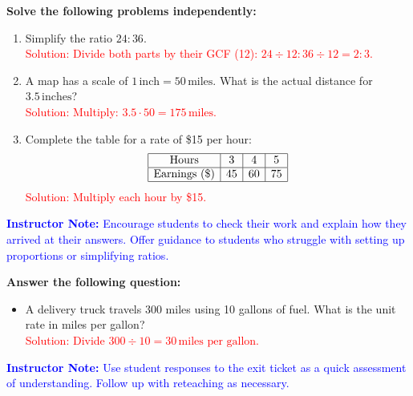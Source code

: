 \documentclass[12pt]{article}
\begin{document}
\begin{tcolorbox}[colframe=black!60, colback=white, 
coltitle=black, colbacktitle=black!15, fonttitle=\bfseries\Large, 
title=Independent Practice, halign title=center, left=10pt, right=10pt, top=10pt, bottom=15pt]
\textbf{Solve the following problems independently:}
\begin{enumerate}[itemsep=3em]
    \item Simplify the ratio \( 24:36 \).\\
    \textcolor{red}{Solution: Divide both parts by their GCF (12): \( 24 \div 12 : 36 \div 12 = 2:3 \).}

    \item A map has a scale of \( 1 \, \text{inch} = 50 \, \text{miles} \). What is the actual distance for \( 3.5 \, \text{inches} \)?\\
    \textcolor{red}{Solution: Multiply: \( 3.5 \cdot 50 = 175 \, \text{miles} \).}

    \item Complete the table for a rate of \$15 per hour:
    \[
    \begin{array}{|c|c|c|c|}
    \hline
    \text{Hours} & 3 & 4 & 5 \\
    \hline
    \text{Earnings (\$)} & 45 & 60 & 75 \\
    \hline
    \end{array}
    \]
    \textcolor{red}{Solution: Multiply each hour by \$15.}
\end{enumerate}

\textcolor{blue}{\textbf{Instructor Note:} Encourage students to check their work and explain how they arrived at their answers. Offer guidance to students who struggle with setting up proportions or simplifying ratios.}
\end{tcolorbox}

\begin{tcolorbox}[colframe=black!60, colback=white, 
coltitle=black, colbacktitle=black!15, fonttitle=\bfseries\Large, 
title=Exit Ticket, halign title=center, left=10pt, right=10pt, top=10pt, bottom=15pt]
\textbf{Answer the following question:}
\begin{itemize}
    \item A delivery truck travels 300 miles using 10 gallons of fuel. What is the unit rate in miles per gallon?\\
    \textcolor{red}{Solution: Divide \( 300 \div 10 = 30 \, \text{miles per gallon} \).}
\end{itemize}

\textcolor{blue}{\textbf{Instructor Note:} Use student responses to the exit ticket as a quick assessment of understanding. Follow up with reteaching as necessary.}
\end{tcolorbox}
\end{document}
